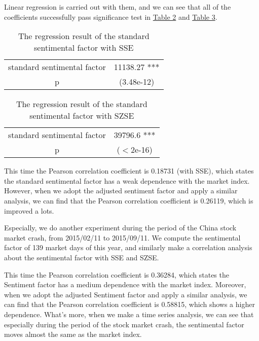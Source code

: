\documentclass[10pt, conference, compsocconf]{IEEEtran}
\begin{document}
Linear regression is carried out with them, and we can see that all of the coefficients successfully pass significance test in \hyperref[Table 2]{Table 2} and \hyperref[Table 3]{Table 3}.

\begin{table}[h]
\caption{The regression result of the standard sentimental factor with SSE}\label{Table 2}
\centering
\begin{tabular}{c|c}
\hline
{standard sentimental factor} & 11138.27 ***\\
{p} & (3.48e-12) \\
\hline
\end{tabular}
\end{table}

\begin{table}[h]
\caption{The regression result of the standard sentimental factor with SZSE}\label{Table 3}
\centering
\begin{tabular}{c|c}
\hline
{standard sentimental factor} & 39796.6 ***\\
{p} & ($<$2e-16) \\
\hline
\end{tabular}
\end{table}

This time the Pearson correlation coefficient is 0.18731 (with SSE), which states the standard sentimental factor has a weak dependence with the market index. However, when we adopt the adjusted sentiment factor and apply a similar analysis, we can find that the Pearson correlation coefficient is 0.26119, which is improved a lots.

Especially, we do another experiment during the period of the China stock market crash, from 2015/02/11 to 2015/09/11. We compute the sentimental factor of 139 market days of this year, and similarly make a correlation analysis about the sentimental factor with SSE and SZSE.

This time the Pearson correlation coefficient is 0.36284, which states the Sentiment factor has a medium dependence with the market index. Moreover, when we adopt the adjusted Sentiment factor and apply a similar analysis, we can find that the Pearson correlation coefficient is 0.58815, which shows a higher dependence. What's more, when we make a time series analysis, we can see that especially during the period of the stock market crash, the sentimental factor moves almost the same as the market index.

\end{document}

